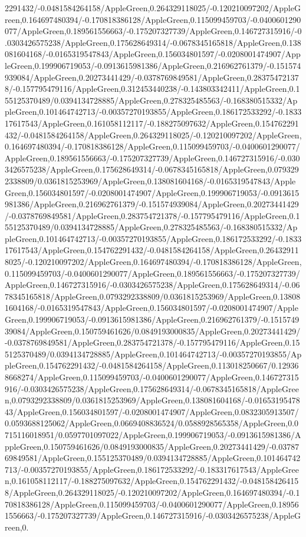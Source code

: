 {\begin{tikzternal}
{2291432/-0.0481584264158/AppleGreen,0.264329118025/-0.120210097202/AppleGreen,0.164697480394/-0.170818386128/AppleGreen,0.115099459703/-0.0400601290077/AppleGreen,0.189561556663/-0.175207327739/AppleGreen,0.146727315916/-0.0303426575238/AppleGreen,0.175628649314/-0.0678345165818/AppleGreen,0.138081604168/-0.0165319547843/AppleGreen,0.156034801597/-0.0208001474907/AppleGreen,0.199906719053/-0.0913615981386/AppleGreen,0.216962761379/-0.151574939084/AppleGreen,0.20273441429/-0.0378769849581/AppleGreen,0.283754721378/-0.157795479116/AppleGreen,0.312453440238/-0.143803342411/AppleGreen,0.155125370489/0.0394134728885/AppleGreen,0.278325485563/-0.168380515332/AppleGreen,0.101464742713/-0.00357270193855/AppleGreen,0.186172533292/-0.183317617543/AppleGreen,0.161058112117/-0.188275097632/AppleGreen,0.154762291432/-0.0481584264158/AppleGreen,0.264329118025/-0.120210097202/AppleGreen,0.164697480394/-0.170818386128/AppleGreen,0.115099459703/-0.0400601290077/AppleGreen,0.189561556663/-0.175207327739/AppleGreen,0.146727315916/-0.0303426575238/AppleGreen,0.175628649314/-0.0678345165818/AppleGreen,0.0793292338809/0.0361815253969/AppleGreen,0.138081604168/-0.0165319547843/AppleGreen,0.156034801597/-0.0208001474907/AppleGreen,0.199906719053/-0.0913615981386/AppleGreen,0.216962761379/-0.151574939084/AppleGreen,0.20273441429/-0.0378769849581/AppleGreen,0.283754721378/-0.157795479116/AppleGreen,0.155125370489/0.0394134728885/AppleGreen,0.278325485563/-0.168380515332/AppleGreen,0.101464742713/-0.00357270193855/AppleGreen,0.186172533292/-0.183317617543/AppleGreen,0.154762291432/-0.0481584264158/AppleGreen,0.264329118025/-0.120210097202/AppleGreen,0.164697480394/-0.170818386128/AppleGreen,0.115099459703/-0.0400601290077/AppleGreen,0.189561556663/-0.175207327739/AppleGreen,0.146727315916/-0.0303426575238/AppleGreen,0.175628649314/-0.0678345165818/AppleGreen,0.0793292338809/0.0361815253969/AppleGreen,0.138081604168/-0.0165319547843/AppleGreen,0.156034801597/-0.0208001474907/AppleGreen,0.199906719053/-0.0913615981386/AppleGreen,0.216962761379/-0.151574939084/AppleGreen,0.150759461626/0.0849193000835/AppleGreen,0.20273441429/-0.0378769849581/AppleGreen,0.283754721378/-0.157795479116/AppleGreen,0.155125370489/0.0394134728885/AppleGreen,0.101464742713/-0.00357270193855/AppleGreen,0.154762291432/-0.0481584264158/AppleGreen,0.113018250667/0.129368668274/AppleGreen,0.115099459703/-0.0400601290077/AppleGreen,0.146727315916/-0.0303426575238/AppleGreen,0.175628649314/-0.0678345165818/AppleGreen,0.0793292338809/0.0361815253969/AppleGreen,0.138081604168/-0.0165319547843/AppleGreen,0.156034801597/-0.0208001474907/AppleGreen,0.0832305913507/0.0593688125062/AppleGreen,0.0669408836524/0.0588928565358/AppleGreen,0.0715116018951/0.0597701097022/AppleGreen,0.199906719053/-0.0913615981386/AppleGreen,0.150759461626/0.0849193000835/AppleGreen,0.20273441429/-0.0378769849581/AppleGreen,0.155125370489/0.0394134728885/AppleGreen,0.101464742713/-0.00357270193855/AppleGreen,0.186172533292/-0.183317617543/AppleGreen,0.161058112117/-0.188275097632/AppleGreen,0.154762291432/-0.0481584264158/AppleGreen,0.264329118025/-0.120210097202/AppleGreen,0.164697480394/-0.170818386128/AppleGreen,0.115099459703/-0.0400601290077/AppleGreen,0.189561556663/-0.175207327739/AppleGreen,0.146727315916/-0.0303426575238/AppleGreen,0.}
\end{tikzternal}}
